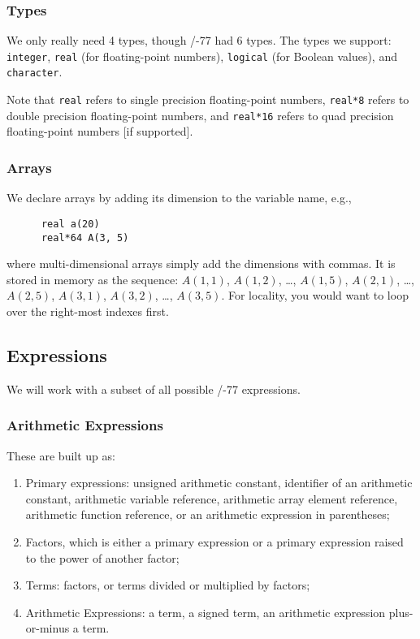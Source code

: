 \subsubsection{Types}
We only really need 4 types, though \FORTRAN/-77 had 6 types. The types
we support: \texttt{integer}, \texttt{real} (for floating-point
numbers), \texttt{logical} (for Boolean values), and \texttt{character}.

Note that \texttt{real} refers to single precision floating-point
numbers, \texttt{real*8} refers to double precision floating-point
numbers, and \texttt{real*16} refers to quad precision floating-point
numbers [if supported].

\subsubsection{Arrays}
We declare arrays by adding its dimension to the variable name, e.g.,
\begin{lstlisting}
      real a(20)
      real*64 A(3, 5)
\end{lstlisting}
where multi-dimensional arrays simply add the dimensions with commas. It
is stored in memory as the sequence: $A(1,1)$, $A(1,2)$, \dots,
$A(1,5)$, $A(2,1)$, \dots, $A(2,5)$, $A(3,1)$, $A(3,2)$, \dots, $A(3,5)$.
For locality, you would want to loop over the right-most indexes first.

\subsection{Expressions}
We will work with a subset of all possible \FORTRAN/-77 expressions.

\subsubsection{Arithmetic Expressions}
These are built up as:
\begin{enumerate}
\item Primary expressions: unsigned arithmetic constant, identifier of
  an arithmetic constant, arithmetic variable reference, arithmetic
  array element reference, arithmetic function reference, or an
  arithmetic expression in parentheses;
\item Factors, which is either a primary expression or a primary
  expression raised to the power of another factor;
\item Terms: factors, or terms divided or multiplied by factors; 
\item Arithmetic Expressions: a term, a signed term, an arithmetic
  expression plus-or-minus a term.
\end{enumerate}

